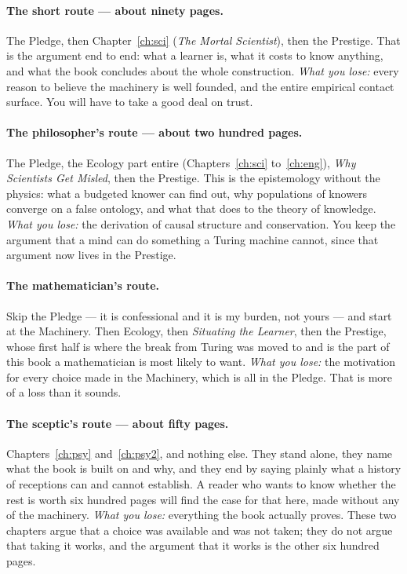 \paragraph{The short route --- about ninety pages.}
The Pledge, then Chapter~\ref{ch:sci} (\emph{The Mortal
Scientist}), then the Prestige.
That is the argument end to end: what a learner is, what it costs
to know anything, and what the book concludes about the whole
construction.
\emph{What you lose:} every reason to believe the machinery is well
founded, and the entire empirical contact surface.
You will have to take a good deal on trust.

\paragraph{The philosopher's route --- about two hundred pages.}
The Pledge, the Ecology part entire (Chapters~\ref{ch:sci}
to~\ref{ch:eng}), \emph{Why Scientists Get Misled}, then the
Prestige.
This is the epistemology without the physics: what a budgeted
knower can find out, why populations of knowers converge on a false
ontology, and what that does to the theory of knowledge.
\emph{What you lose:} the derivation of causal structure and
conservation.
You keep the argument that a mind can do something a Turing machine
cannot, since that argument now lives in the Prestige.

\paragraph{The mathematician's route.}
Skip the Pledge --- it is confessional and it is my burden, not
yours --- and start at the Machinery.
Then Ecology, then \emph{Situating the Learner}, then the Prestige,
whose first half is where the break from Turing was moved to and is the
part of this book a mathematician is most likely to want.
\emph{What you lose:} the motivation for every choice made in the
Machinery, which is all in the Pledge.
That is more of a loss than it sounds.

\paragraph{The sceptic's route --- about fifty pages.}
Chapters~\ref{ch:psy} and~\ref{ch:psy2}, and nothing else.
They stand alone, they name what the book is built on and why, and
they end by saying plainly what a history of receptions can and
cannot establish.
A reader who wants to know whether the rest is worth six hundred
pages will find the case for that here, made without any of the
machinery.
\emph{What you lose:} everything the book actually proves.
These two chapters argue that a choice was available and was not
taken; they do not argue that taking it works, and the argument that
it works is the other six hundred pages.

